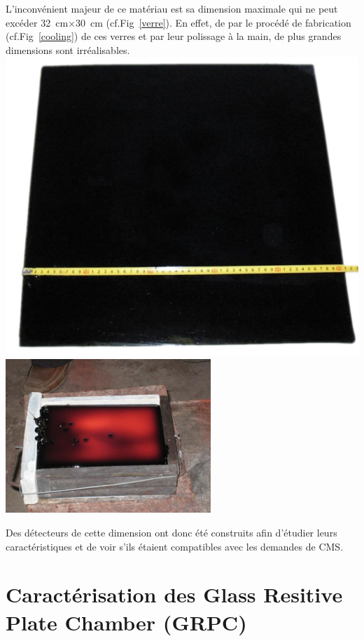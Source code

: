 L'inconvénient majeur de ce matériau est sa dimension maximale qui ne peut excéder \SI{32}{\centi\meter}$\times$\SI{30}{\centi\meter} (cf.Fig~\ref{verre}). En effet, de par le procédé de fabrication (cf.Fig~\ref{cooling}) de ces verres et par leur polissage à la main, de plus grandes dimensions sont irréalisables.
\marginpar
{
	\centering
	\includegraphics[width=\marginparwidth]{GLA/verre.png}
	\label{verre}
}
\marginpar
{
	\centering
	\includegraphics[width=\marginparwidth]{GLA/cooling.png}
	\label{cooling}
}

Des détecteurs de cette dimension ont donc été construits afin d'étudier leurs caractéristiques et de voir s'ils étaient compatibles avec les demandes de CMS.

\section{Caractérisation des Glass Resitive Plate Chamber (GRPC)}
 
